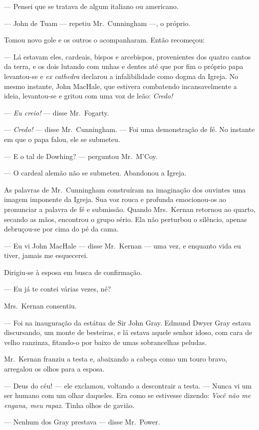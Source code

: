 --- Pensei que se tratava de algum italiano ou americano.

--- John de Tuam --- repetiu Mr.~Cunningham ---, o próprio.

Tomou novo gole e os outros o acompanharam.  Então recomeçou:

--- Lá estavam eles, cardeais, bispos e arcebispos, provenientes dos quatro
cantos da terra, e os dois lutando com unhas e dentes até que por fim o próprio
papa levantou-se e \textit{ex cathedra} declarou a infalibilidade como dogma da
Igreja.  No mesmo instante, John MacHale, que estivera combatendo
incansavelmente a ideia, levantou-se e gritou com uma voz de leão:
\textit{Credo!}

--- \textit{Eu creio!} --- disse Mr.~Fogarty.

--- \textit{Credo!} --- disse Mr.~Cunningham.  --- Foi uma demonstração de fé.
No instante em que o papa falou, ele se submeteu.

--- E o tal de Dowhing? --- perguntou Mr.~M’Coy.

--- O cardeal alemão não se submeteu.  Abandonou a Igreja.

As palavras de Mr.~Cunningham construíram na imaginação dos ouvintes uma imagem
imponente da Igreja.  Sua voz rouca e profunda emocionou-os ao pronunciar a
palavra de fé e submissão.  Quando Mrs.~Kernan retornou ao quarto, secando as
mãos, encontrou o grupo sério.  Ela não perturbou o silêncio, apenas
debruçou-se por cima do pé da cama.

--- Eu vi John MacHale --- disse Mr.~Kernan --- uma vez, e enquanto vida eu
tiver, jamais me esquecerei.

Dirigiu-se à esposa em busca de confirmação.

--- Eu já te contei várias vezes, né?

Mrs.~Kernan consentiu.

--- Foi na inauguração da estátua de Sir John Gray.  Edmund Dwyer Gray estava
discursando, um monte de besteiras, e lá estava aquele senhor idoso, com cara
de velho ranzinza, fitando-o por baixo de umas sobrancelhas peludas.

Mr.~Kernan franziu a testa e, abaixando a cabeça como um touro bravo, arregalou
os olhos para a esposa.

--- Deus do céu! --- ele exclamou, voltando a descontrair a testa.  --- Nunca
vi um ser humano com um olhar daqueles.  Era como se estivesse dizendo:
\textit{Você não me engana, meu rapaz}.  Tinha olhos de gavião.

--- Nenhum dos Gray prestava --- disse Mr.~Power.  

